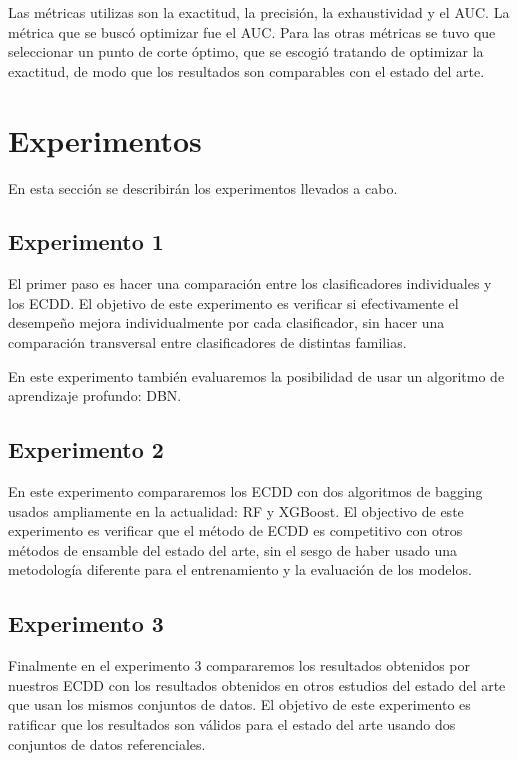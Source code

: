 Las métricas utilizas son la exactitud, la precisión, la exhaustividad y el \ac{AUC}. La métrica que se buscó optimizar fue el \ac{AUC}. Para las otras métricas se tuvo que seleccionar un punto de corte óptimo, que se escogió tratando de optimizar la exactitud, de modo que los resultados son comparables con el estado del arte.

\section{Experimentos}

En esta sección se describirán los experimentos llevados a cabo.

\subsection{Experimento 1}

El primer paso es hacer una comparación entre los clasificadores individuales y los \ac{ECDD}. El objetivo de este experimento es verificar si efectivamente el desempeño mejora individualmente por cada clasificador, sin hacer una comparación transversal entre clasificadores de distintas familias.

En este experimento también evaluaremos la posibilidad de usar un algoritmo de aprendizaje profundo: \ac{DBN}.

\subsection{Experimento 2}

En este experimento compararemos los \ac{ECDD} con dos algoritmos de bagging usados ampliamente en la actualidad: \ac{RF} y \ac{XGBoost}. El objectivo de este experimento es verificar que el método de \ac{ECDD} es competitivo con otros métodos de ensamble del estado del arte, sin el sesgo de haber usado una metodología diferente para el entrenamiento y la evaluación de los modelos.

\subsection{Experimento 3}

Finalmente en el experimento 3 compararemos los resultados obtenidos por nuestros \ac{ECDD} con los resultados obtenidos en otros estudios del estado del arte que usan los mismos conjuntos de datos. El objetivo de este experimento es ratificar que los resultados son válidos para el estado del arte usando dos conjuntos de datos referenciales.

